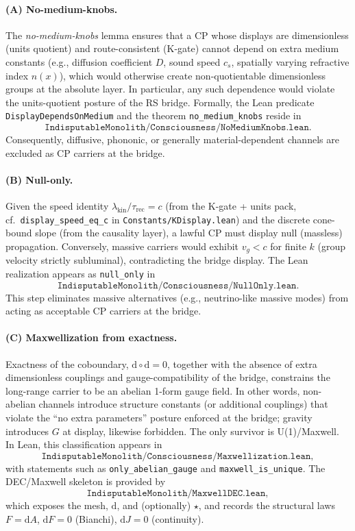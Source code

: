 \documentclass[12pt,a4paper]{article}
\begin{document}
\paragraph{(A) No-medium-knobs.}
The \emph{no-medium-knobs} lemma ensures that a CP whose displays are dimensionless (units quotient) and route-consistent (K-gate) cannot depend on extra medium constants (e.g., diffusion coefficient \(D\), sound speed \(c_s\), spatially varying refractive index \(n(x)\)), which would otherwise create non-quotientable dimensionless groups at the absolute layer. In particular, any such dependence would violate the units-quotient posture of the RS bridge. Formally, the Lean predicate \texttt{DisplayDependsOnMedium} and the theorem \texttt{no\_medium\_knobs} reside in
\[
  \texttt{IndisputableMonolith/Consciousness/NoMediumKnobs.lean}.
\]
Consequently, diffusive, phononic, or generally material-dependent channels are excluded as CP carriers at the bridge.

\paragraph{(B) Null-only.}
Given the speed identity \(\lambda_{\mathrm{kin}}/\tau_{\mathrm{rec}}=c\) (from the K-gate + units pack, cf.\ \texttt{display\_speed\_eq\_c} in \texttt{Constants/KDisplay.lean}) and the discrete cone-bound slope (from the causality layer), a lawful CP must display null (massless) propagation. Conversely, massive carriers would exhibit \(v_g<c\) for finite \(k\) (group velocity strictly subluminal), contradicting the bridge display. The Lean realization appears as \texttt{null\_only} in
\[
  \texttt{IndisputableMonolith/Consciousness/NullOnly.lean}.
\]
This step eliminates massive alternatives (e.g., neutrino-like massive modes) from acting as acceptable CP carriers at the bridge.

\paragraph{(C) Maxwellization from exactness.}
Exactness of the coboundary, \(\mathrm{d}\circ \mathrm{d}=0\), together with the absence of extra dimensionless couplings and gauge-compatibility of the bridge, constrains the long-range carrier to be an abelian 1-form gauge field. In other words, non-abelian channels introduce structure constants (or additional couplings) that violate the ``no extra parameters'' posture enforced at the bridge; gravity introduces \(G\) at display, likewise forbidden. The only survivor is U(1)/Maxwell. In Lean, this classification appears in
\[
  \texttt{IndisputableMonolith/Consciousness/Maxwellization.lean},
\]
with statements such as \texttt{only\_abelian\_gauge} and \texttt{maxwell\_is\_unique}. The DEC/Maxwell skeleton is provided by
\[
  \texttt{IndisputableMonolith/MaxwellDEC.lean},
\]
which exposes the mesh, \(\mathrm{d}\), and (optionally) \(\star\), and records the structural laws \(F=\mathrm{d}A\), \(\mathrm{d}F=0\) (Bianchi), \(\mathrm{d}J=0\) (continuity).
\end{document}
